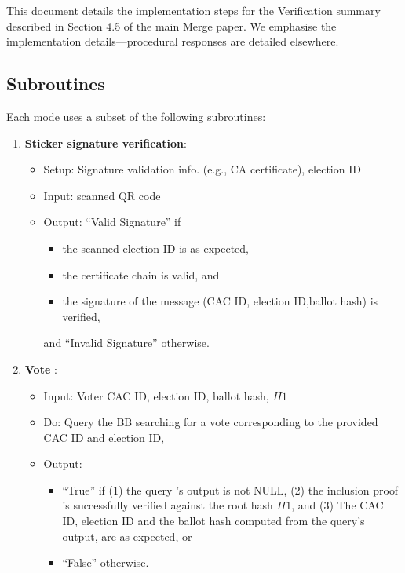 \documentclass{article}
\begin{document}
    This document details the implementation steps for the Verification summary described in Section 4.5 of the main Merge paper. We emphasise the implementation details---procedural responses are detailed elsewhere.

\subsection{Subroutines}
Each mode uses a subset of the following subroutines:

\begin{enumerate}
    \item \textbf{Sticker signature verification}:
\begin{itemize}
\item Setup: Signature validation info. (e.g., CA certificate), election ID
    \item Input: scanned QR code
    \item Output: ``Valid Signature'' if 
    \begin{itemize}
        \item the scanned election ID is as expected, 
        \item the certificate chain is valid, and
        \item the signature of the message (CAC ID, election ID,ballot hash) is verified,
    \end{itemize}
    and ``Invalid Signature'' otherwise.
\end{itemize}
\label{Sticker signature verification}
    \item \textbf{Vote \BBInclusionCheck{}}:

\begin{itemize}
    \item    Input: Voter CAC ID, election ID, ballot hash, $H1$
    \item     Do: Query the BB  searching for a vote corresponding to the provided CAC ID and election ID,
    \item Output: 
    \begin{itemize}
        \item ``True'' if (1) the query 's output is not NULL, (2) the inclusion proof is successfully verified against the root hash $H1$, and
        (3) The CAC ID, election ID and the ballot hash computed from the query's output, are as expected, or
        \item ``False'' otherwise.
    \end{itemize}


\end{itemize}
\end{enumerate}
\end{document}
